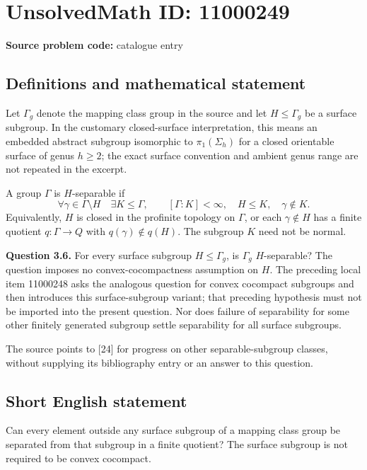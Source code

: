 \documentclass[11pt]{article}
\begin{document}
\section*{UnsolvedMath ID: 11000249}
\textbf{Source problem code:} catalogue entry
\subsection{Definitions and mathematical statement}
Let $\Gamma_g$ denote the mapping class group in the source and let $H\le\Gamma_g$ be a surface subgroup. In the customary closed-surface interpretation, this means an embedded abstract subgroup isomorphic to $\pi_1(\Sigma_h)$ for a closed orientable surface of genus $h\ge2$; the exact surface convention and ambient genus range are not repeated in the excerpt.

A group $\Gamma$ is $H$-separable if
\[
 \forall\gamma\in\Gamma\setminus H\quad\exists K\le\Gamma,
 \qquad [\Gamma:K]<\infty,\quad H\le K,\quad\gamma\notin K.
\]
Equivalently, $H$ is closed in the profinite topology on $\Gamma$, or each $\gamma\notin H$ has a finite quotient $q:\Gamma\to Q$ with $q(\gamma)\notin q(H)$. The subgroup $K$ need not be normal.

\textbf{Question 3.6.} For every surface subgroup $H\le\Gamma_g$, is $\Gamma_g$ $H$-separable? The question imposes no convex-cocompactness assumption on $H$. The preceding local item 11000248 asks the analogous question for convex cocompact subgroups and then introduces this surface-subgroup variant; that preceding hypothesis must not be imported into the present question. Nor does failure of separability for some other finitely generated subgroup settle separability for all surface subgroups.

The source points to [24] for progress on other separable-subgroup classes, without supplying its bibliography entry or an answer to this question.
\subsection{Short English statement}
Can every element outside any surface subgroup of a mapping class group be separated from that subgroup in a finite quotient? The surface subgroup is not required to be convex cocompact.
\end{document}
